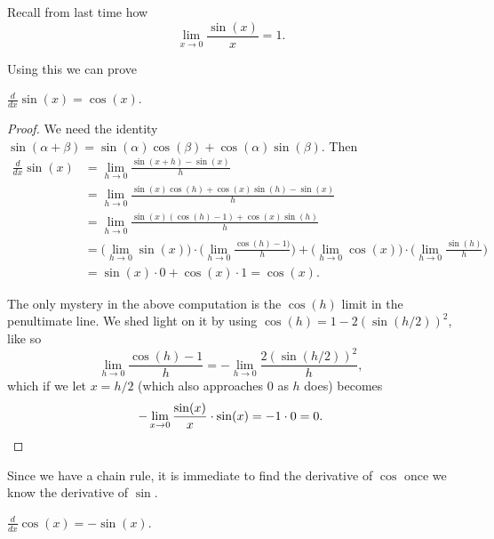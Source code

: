 
Recall from last time how
\[
	\lim_{x \to 0} \frac{\sin(x)}{x} = 1.
\]

\noindent
Using this we can prove

\begin{proposition}
	$\displaystyle \frac{d}{d x} \sin(x) = \cos(x)$.
\end{proposition}

\begin{proof}
	We need the identity $\sin(\alpha + \beta) = \sin(\alpha) \cos(\beta) + \cos(\alpha) \sin(\beta)$.
	Then
	\begin{align*}
		\frac{d}{d x} \sin(x) & = \lim_{h \to 0} \frac{\sin(x + h) - \sin(x)}{h}                                                                                                                                             \\
		                      & = \lim_{h \to 0} \frac{\sin(x) \cos(h) + \cos(x) \sin(h) - \sin(x)}{h}                                                                                                                       \\
		                      & = \lim_{h \to 0} \frac{\sin(x) (\cos(h) - 1) + \cos(x) \sin(h)}{h}                                                                                                                           \\
		                      & = \Big ( \lim_{h \to 0} \sin(x) \Big ) \cdot \Big ( \lim_{h \to 0} \frac{\cos(h) - 1)}{h} \Big ) + \Big ( \lim_{h \to 0} \cos(x) \Big ) \cdot \Big ( \lim_{h \to 0} \frac{\sin(h)}{h} \Big ) \\
		                      & = \sin(x) \cdot 0 + \cos(x) \cdot 1 = \cos(x).
	\end{align*}

	\noindent
	The only mystery in the above computation is the $\cos(h)$ limit in the penultimate line.
	We shed light on it by using $\cos(h) = 1 - 2 (\sin(h / 2))^2$, like so
	\[
		\lim_{h \to 0} \frac{\cos(h) - 1}{h} = - \lim_{h \to 0} \frac{2 (\sin(h / 2))^2}{h},
	\]
	which if we let $x = h / 2$ (which also approaches $0$ as $h$ does) becomes
	\[
		- \lim_{x \to 0} \frac{\sin(x)}{x} \cdot \sin(x) = -1 \cdot 0 = 0. \qedhere
	\]
\end{proof}

\noindent
Since we have a chain rule, it is immediate to find the derivative of $\cos$ once we know the derivative of $\sin$.

\begin{corollary}
	$\displaystyle \frac{d}{d x} \cos(x) = - \sin(x)$.
\end{corollary}

